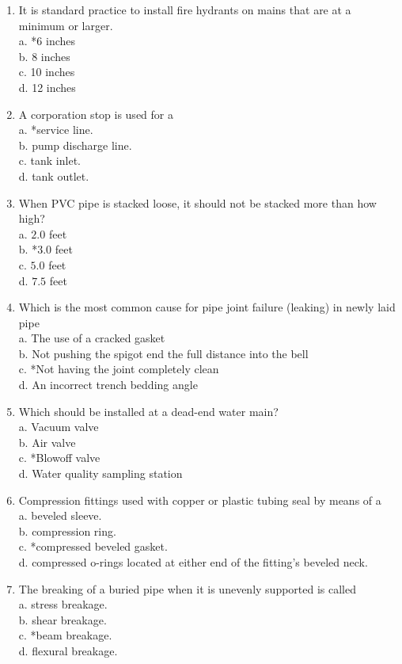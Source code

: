 \documentclass[10pt]{article}
\begin{document}
\begin{enumerate}
  \item It is standard practice to install fire hydrants on mains that are at a minimum or larger.\\
a. *6 inches\\
b. 8 inches\\
c. 10 inches\\
d. 12 inches

  \item A corporation stop is used for a\\
a. *service line.\\
b. pump discharge line.\\
c. tank inlet.\\
d. tank outlet.

  \item When PVC pipe is stacked loose, it should not be stacked more than how high?\\
a. $2.0$ feet\\
b. *$3.0$ feet\\
c. $5.0$ feet\\
d. $7.5$ feet

  \item Which is the most common cause for pipe joint failure (leaking) in newly laid pipe\\
a. The use of a cracked gasket\\
b. Not pushing the spigot end the full distance into the bell\\
c. *Not having the joint completely clean\\
d. An incorrect trench bedding angle

  \item Which should be installed at a dead-end water main?\\
a. Vacuum valve\\
b. Air valve\\
c. *Blowoff valve\\
d. Water quality sampling station

  \item Compression fittings used with copper or plastic tubing seal by means of a\\
a. beveled sleeve.\\
b. compression ring.\\
c. *compressed beveled gasket.\\
d. compressed o-rings located at either end of the fitting's beveled neck. 

  \item The breaking of a buried pipe when it is unevenly supported is called\\
a. stress breakage.\\
b. shear breakage.\\
c. *beam breakage.\\
d. flexural breakage.


\end{enumerate}
\end{document}
